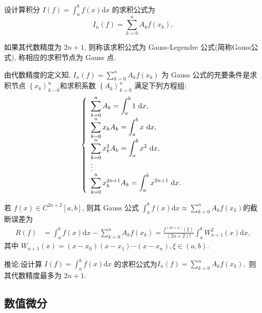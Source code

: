\begin{tcolorbox}[enhanced,colback=yellow!5!white,colframe=yellow!50!black,colbacktitle=yellow!80!black,title=定义]
    设计算积分 $ I(f)=\int_{a}^{b} f(x) \mathrm{d} x $ 的求积公式为
$$
I_{n}(f)=\sum_{k=0}^{n} A_{k} f\left(x_{k}\right),
$$

如果其代数精度为 $ 2 n+1 $, 则称该求积公式为 Gauss-Legendre 公式(简称Gauss公式), 称相应的求积节点为 Gauss 点.
\end{tcolorbox}

由代数精度的定义知, $\displaystyle I_{n}(f)=\sum_{k=0}^{n} A_{k} f\left(x_{k}\right)$ 为 Gauss 公式的充要条件是求积节点 $ \left\{x_{k}\right\rangle_{k-0}^{n} $和求积系数 $ \left\{A_{k}\right\rangle_{k=0}^{n} $ 满足下列方程组:
$$
\left\{\begin{array}{l}\displaystyle
\displaystyle\sum_{k=0}^{n} A_{k}=\int_{a}^{b} 1 \mathrm{~d} x, \\
\displaystyle\sum_{k=0}^{n} x_{k} A_{k}=\int_{a}^{b} x \mathrm{~d} x, \\
\displaystyle\sum_{k=0}^{n} x_{k}^{2} A_{k}=\int_{a}^{b} x^{2} \mathrm{~d} x, \\
\vdots \\
\displaystyle\sum_{k=0}^{n} x_{k}^{2 n+1} A_{k}=\int_{a}^{b} x^{2 n+1} \mathrm{~d} x .
\end{array}\right.
$$


\begin{tcolorbox}[enhanced,colback=2,colframe=1,breakable,coltitle=green!25!black,title=定理]
若 $ f(x) \in C^{2 n+2}[a, b] $, 则其 Gauss 公式
$\displaystyle\int_{a}^{b} f(x) \mathrm{d} x \approx \sum_{k=0}^{n} A_{k} f\left(x_{k}\right)$的截断误差为
$$
\begin{aligned}
R(f) & =\int_{a}^{b} f(x) \mathrm{d} x-\sum_{k=0}^{n} A_{k} f\left(x_{k}\right) =\frac{f^{(2 n+2)}(\xi)}{(2 n+2)!} \int_{a}^{b} W_{n+1}^{2}(x) \mathrm{d} x,
\end{aligned}
$$
其中 $ W_{n+1}(x)=\left(x-x_{0}\right)\left(x-x_{1}\right) \cdots\left(x-x_{n}\right), \xi \in(a, b) $.
 \end{tcolorbox}

推论:设计算 $ I(f)=\displaystyle\int_{a}^{b} f(x) \mathrm{d} x $ 的求积公式为$I_{n}(f)=\displaystyle\sum_{k=0}^{n} A_{k} f\left(x_{k}\right),$
则其代数精度最多为 $ 2 n+1 $.

\subsection{数值微分}

